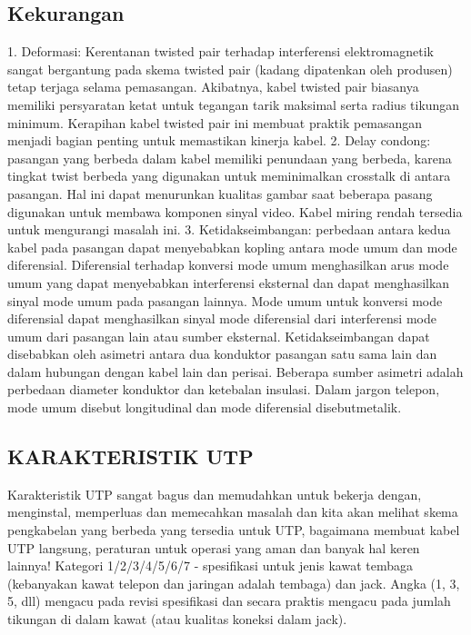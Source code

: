 \subsection{Kekurangan}
1. Deformasi: Kerentanan twisted pair terhadap interferensi elektromagnetik sangat bergantung pada skema twisted pair (kadang dipatenkan oleh produsen) tetap terjaga selama pemasangan. Akibatnya, kabel twisted pair biasanya memiliki persyaratan ketat untuk tegangan tarik maksimal serta radius tikungan minimum. Kerapihan kabel twisted pair ini membuat praktik pemasangan menjadi bagian penting untuk memastikan kinerja kabel.
2. Delay condong: pasangan yang berbeda dalam kabel memiliki penundaan yang berbeda, karena tingkat twist berbeda yang digunakan untuk meminimalkan crosstalk di antara pasangan. Hal ini dapat menurunkan kualitas gambar saat beberapa pasang digunakan untuk membawa komponen sinyal video. Kabel miring rendah tersedia untuk mengurangi masalah ini.
3. Ketidakseimbangan: perbedaan antara kedua kabel pada pasangan dapat menyebabkan kopling antara mode umum dan mode diferensial. Diferensial terhadap konversi mode umum menghasilkan arus mode umum yang dapat menyebabkan interferensi eksternal dan dapat menghasilkan sinyal mode umum pada pasangan lainnya. Mode umum untuk konversi mode diferensial dapat menghasilkan sinyal mode diferensial dari interferensi mode umum dari pasangan lain atau sumber eksternal. Ketidakseimbangan dapat disebabkan oleh asimetri antara dua konduktor pasangan satu sama lain dan dalam hubungan dengan kabel lain dan perisai. Beberapa sumber asimetri adalah perbedaan diameter konduktor dan ketebalan insulasi. Dalam jargon telepon, mode umum disebut longitudinal dan mode diferensial disebutmetalik.

\subsection{KARAKTERISTIK UTP}

Karakteristik UTP sangat bagus dan memudahkan untuk bekerja dengan, menginstal, memperluas dan memecahkan masalah dan kita akan melihat skema pengkabelan yang 
berbeda yang tersedia untuk UTP, bagaimana membuat kabel UTP langsung, peraturan untuk operasi yang aman dan banyak hal keren lainnya!
Kategori 1/2/3/4/5/6/7 - spesifikasi untuk jenis kawat tembaga (kebanyakan kawat telepon dan jaringan adalah tembaga) dan jack. Angka (1, 3, 5, dll) 
mengacu pada revisi spesifikasi dan secara praktis mengacu pada jumlah tikungan di dalam kawat (atau kualitas koneksi dalam jack).



